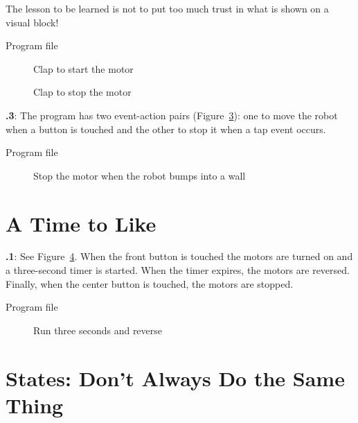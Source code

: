 \documentclass[12pt,a4paper,english]{article}
\begin{document}
The lesson to be learned is not to put
too much trust in what is shown on a visual block!

{\raggedleft \hfill Program file }

\begin{figure}
\begin{center}
\caption{Clap to start the motor}\label{fig.clap-to-start}
\end{center}
\end{figure}

\begin{figure}[hbt]
\begin{center}
\caption{Clap to stop the motor}\label{fig.clap-to-stop}
\end{center}
\end{figure}

\textbf{\thesection.3}:
The program has two event-action pairs (Figure~\ref{fig.bump}): one to
move the robot when a button is touched and the other to stop it when a
tap event occurs.

{\raggedleft \hfill Program file }

\begin{figure}[hbt]
\begin{center}
\caption{Stop the motor when the robot bumps into a wall}\label{fig.bump}
\end{center}
\end{figure}


\section{A Time to Like}

\textbf{\thesection.1}:
See Figure~\ref{fig.three}. When the front button
is touched the motors are turned on and a three-second timer is started.
When the timer expires, the motors are reversed. Finally, when the
center button is touched, the motors are stopped.

{\raggedleft \hfill Program file }


\begin{figure}[hbt]
\begin{center}
\caption{Run three seconds and reverse}\label{fig.three}
\end{center}
\end{figure}


\section{States: Don't Always Do the Same Thing}
\end{document}
